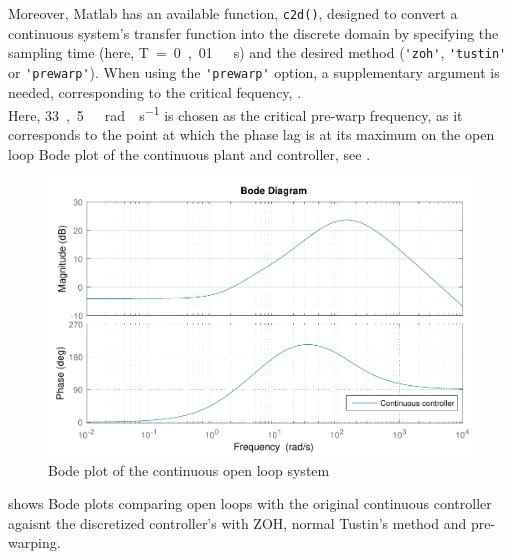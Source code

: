 Moreover, Matlab has an available function, \lstinline{c2d()}, designed to convert a continuous system's transfer function into the discrete domain by specifying the sampling time (here, \si{T = 0,01\ s}) and the desired method (\lstinline{'zoh'}, \lstinline{'tustin'} or \lstinline{'prewarp'}). When using the \lstinline{'prewarp'} option, a supplementary argument is needed, corresponding to the critical fequency, \cite{Matlabc2d}.\\
Here, \si{33,5\ rad \cdot s^{-1}} is chosen as the critical pre-warp frequency, as it corresponds to the point at which the phase lag is at its maximum on the open loop Bode plot of the continuous plant and controller, see .
%
\begin{figure}[H]
  \centering
  \includegraphics[scale=0.65]{figures/openLoopBadSISOController}
  \caption{Bode plot of the continuous open loop system}
  \label{fig:bodeOpenLoopContinuous}
\end{figure}
%
 shows Bode plots comparing open loops with the original continuous controller agaisnt the discretized controller's with ZOH, normal Tustin's method and pre-warping.
%

